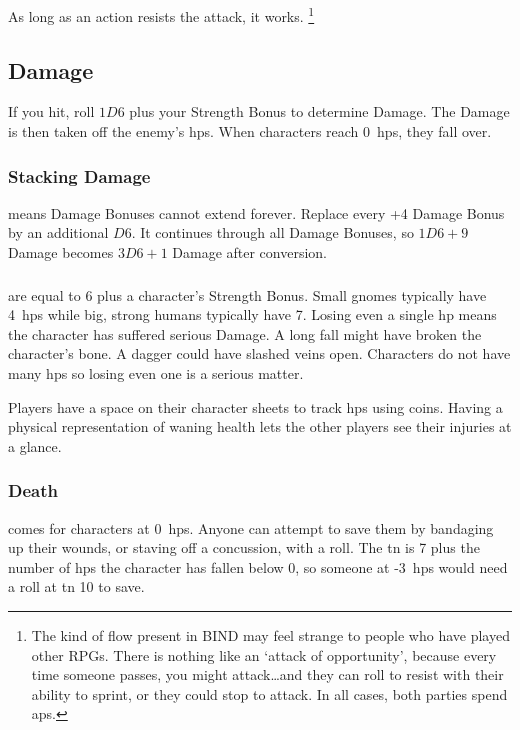 \begin{multicols}{2}
As long as an action resists the attack, it works.%
\footnote{The kind of flow present in BIND may feel strange to people who have played other RPGs.
There is nothing like an `attack of opportunity', because every time someone passes, you might attack\ldots and they can roll to resist with their ability to sprint, or they could stop to attack.
In all cases, both parties spend \glspl{ap}.}

\begin{figure*}[t!]
  \stackingDamageChart
\end{figure*}

\subsection{Damage}

If you hit, roll $1D6$ plus your Strength Bonus to determine Damage.
The Damage is then taken off the enemy's \glspl{hp}.
When characters reach 0~\glspl{hp}, they fall over.

\subsubsection{Stacking Damage}
\label{stackingDamage}
means Damage Bonuses cannot extend forever.
Replace every +4 Damage Bonus by an additional $D6$.
It continues through all Damage Bonuses, so $1D6+9$ Damage becomes $3D6+1$ Damage after conversion.

\subsubsection{}
are equal to 6 plus a character's Strength Bonus.
Small gnomes typically have 4~\glspl{hp} while big, strong humans typically have 7.
Losing even a single \gls{hp} means the character has suffered serious Damage.
A long fall might have broken the character's bone.
A dagger could have slashed veins open.
Characters do not have many \glspl{hp} so losing even one is a serious matter.

Players have a space on their character sheets to track \glspl{hp} using coins.
Having a physical representation of waning health lets the other players see their injuries at a glance.

\subsubsection{Death}
\label{death}
comes for characters at 0~\glspl{hp}.
Anyone can attempt to save them by bandaging up their wounds, or staving off a concussion, with a  roll.
The \gls{tn} is 7 plus the number of \glspl{hp} the character has fallen below 0, so someone at -3~\glspl{hp} would need a roll at \gls{tn} 10 to save.


\end{multicols}
